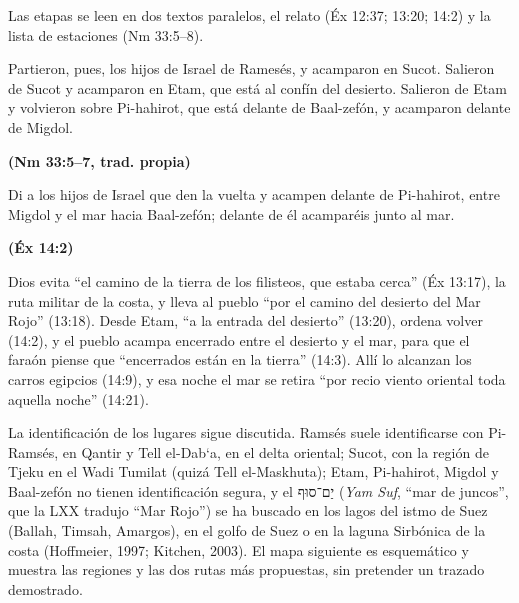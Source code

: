 \documentclass[11pt,letterpaper]{article}
\newcommand{\heb}[1]{\mbox{\foreignlanguage{hebrew}{#1}}}
\newcommand{\fuente}[1]{\par\hfill{\upshape\bfseries\small\textcolor{tierraroja}{#1}}}
\begin{document}
Las etapas se leen en dos textos paralelos, el relato (Éx 12:37; 13:20; 14:2) y la lista de estaciones (Nm 33:5--8).

\begin{cita}Partieron, pues, los hijos de Israel de Ramesés, y acamparon en Sucot. Salieron de Sucot y acamparon en Etam, que está al confín del desierto. Salieron de Etam y volvieron sobre Pi-hahirot, que está delante de Baal-zefón, y acamparon delante de Migdol.\fuente{(Nm 33:5--7, trad. propia)}\end{cita}

\begin{cita}Di a los hijos de Israel que den la vuelta y acampen delante de Pi-hahirot, entre Migdol y el mar hacia Baal-zefón; delante de él acamparéis junto al mar.\fuente{(Éx 14:2)}\end{cita}

Dios evita ``el camino de la tierra de los filisteos, que estaba cerca'' (Éx 13:17), la ruta militar de la costa, y lleva al pueblo ``por el camino del desierto del Mar Rojo'' (13:18). Desde Etam, ``a la entrada del desierto'' (13:20), ordena volver (14:2), y el pueblo acampa encerrado entre el desierto y el mar, para que el faraón piense que ``encerrados están en la tierra'' (14:3). Allí lo alcanzan los carros egipcios (14:9), y esa noche el mar se retira ``por recio viento oriental toda aquella noche'' (14:21).

La identificación de los lugares sigue discutida. Ramsés suele identificarse con Pi-Ramsés, en Qantir y Tell el-Dab`a, en el delta oriental; Sucot, con la región de Tjeku en el Wadi Tumilat (quizá Tell el-Maskhuta); Etam, Pi-hahirot, Migdol y Baal-zefón no tienen identificación segura, y el \heb{יַם־סוּף} (\emph{Yam Suf}, ``mar de juncos'', que la LXX tradujo ``Mar Rojo'') se ha buscado en los lagos del istmo de Suez (Ballah, Timsah, Amargos), en el golfo de Suez o en la laguna Sirbónica de la costa (Hoffmeier, 1997; Kitchen, 2003). El mapa siguiente es esquemático y muestra las regiones y las dos rutas más propuestas, sin pretender un trazado demostrado.
\end{document}
